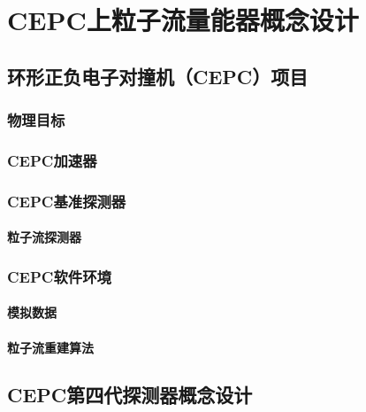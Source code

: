 \chapter{CEPC上粒子流量能器概念设计}
\label{chap:cepc4thdet}

\section{环形正负电子对撞机（CEPC）项目}
\subsection{物理目标}
\subsection{CEPC加速器}
\subsection{CEPC基准探测器}
\subsubsection{粒子流探测器}
\subsection{CEPC软件环境}
\subsubsection{模拟数据}
\subsubsection{粒子流重建算法}

\section{CEPC第四代探测器概念设计}


